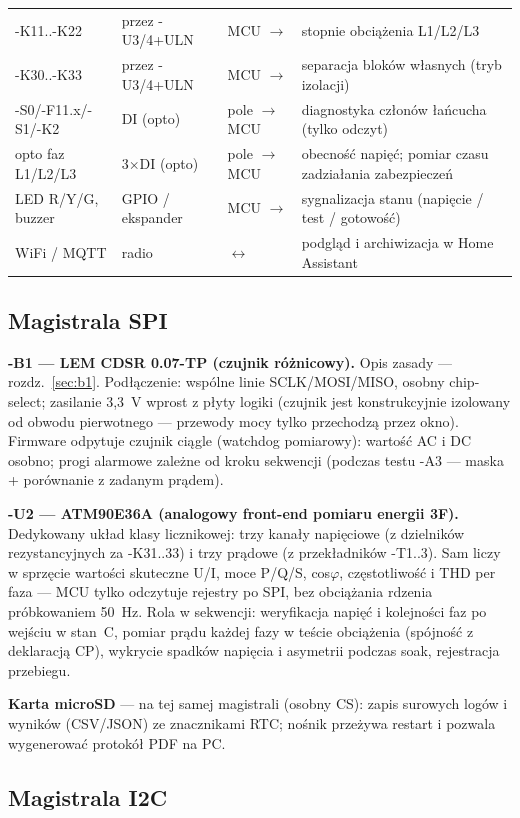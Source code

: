 \documentclass[11pt,a4paper]{article}
\begin{document}
\begin{longtable}{@{}p{}p{}p{}p{}@{}}
-K11..-K22 & przez -U3/4+ULN & MCU $\to$ & stopnie obciążenia L1/L2/L3\\
-K30..-K33 & przez -U3/4+ULN & MCU $\to$ & separacja bloków własnych (tryb izolacji)\\
-S0/-F11.x/-S1/-K2 & DI (opto) & pole $\to$ MCU & diagnostyka członów łańcucha (tylko odczyt)\\
opto faz L1/L2/L3 & 3$\times$DI (opto) & pole $\to$ MCU & obecność napięć; pomiar czasu zadziałania zabezpieczeń\\
LED R/Y/G, buzzer & GPIO / ekspander & MCU $\to$ & sygnalizacja stanu (napięcie / test / gotowość)\\
WiFi / MQTT & radio & $\leftrightarrow$ & podgląd i archiwizacja w Home Assistant\\
\bottomrule
\end{longtable}

\subsection{Magistrala SPI}
\label{sec:mcu-spi}

\textbf{-B1 --- LEM CDSR 0.07-TP (czujnik różnicowy).} Opis zasady --- rozdz.~\ref{sec:b1}.
Podłączenie: wspólne linie SCLK/MOSI/MISO, osobny chip-select; zasilanie 3,3~V wprost z płyty
logiki (czujnik jest konstrukcyjnie izolowany od obwodu pierwotnego --- przewody mocy tylko
przechodzą przez okno). Firmware odpytuje czujnik ciągle (watchdog pomiarowy): wartość AC i DC
osobno; progi alarmowe zależne od kroku sekwencji (podczas testu -A3 --- maska + porównanie
z zadanym prądem).

\textbf{-U2 --- ATM90E36A (analogowy front-end pomiaru energii 3F).}
\label{sec:u2}
Dedykowany układ klasy licznikowej: trzy kanały napięciowe (z dzielników rezystancyjnych
za -K31..33) i trzy prądowe (z przekładników -T1..3). Sam liczy w sprzęcie wartości skuteczne
U/I, moce P/Q/S, cos$\varphi$, częstotliwość i THD per faza --- MCU tylko odczytuje rejestry
po SPI, bez obciążania rdzenia próbkowaniem 50~Hz. Rola w sekwencji: weryfikacja napięć
i kolejności faz po wejściu w stan~C, pomiar prądu każdej fazy w teście obciążenia (spójność
z deklaracją CP), wykrycie spadków napięcia i asymetrii podczas soak, rejestracja przebiegu.

\textbf{Karta microSD} --- na tej samej magistrali (osobny CS): zapis surowych logów i wyników
(CSV/JSON) ze znacznikami RTC; nośnik przeżywa restart i pozwala wygenerować protokół PDF na PC.

\subsection{Magistrala I2C}
\label{sec:mcu-i2c}
\end{document}
